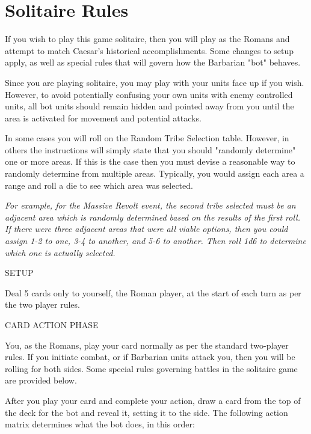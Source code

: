 \section{Solitaire Rules}

If you wish to play this game solitaire, then you will play as the Romans and attempt to match Caesar's historical accomplishments. Some changes to setup apply, as well as special rules that will govern how the Barbarian "bot" behaves.

Since you are playing solitaire, you may play with your units face up if you wish. However, to avoid potentially confusing your own units with enemy controlled units, all bot units should remain hidden and pointed away from you until the area is activated for movement and potential attacks.

In some cases you will roll on the Random Tribe Selection table. However, in others the instructions will simply state that you should "randomly determine" one or more areas. If this is the case then you must devise a reasonable way to randomly determine from multiple areas. Typically, you would assign each area a range and roll a die to see which area was selected.

\textit{For example, for the Massive Revolt event, the second tribe selected must be an adjacent area which is randomly determined based on the results of the first roll. If there were three adjacent areas that were all viable options, then you could assign 1-2 to one, 3-4 to another, and 5-6 to another. Then roll 1d6 to determine which one is actually selected.}

SETUP

Deal 5 cards only to yourself, the Roman player, at the start of each turn as per the two player rules.

CARD ACTION PHASE

You, as the Romans, play your card normally as per the standard two-player rules. If you initiate combat, or if Barbarian units attack you, then you will be rolling for both sides. Some special rules governing battles in the solitaire game are provided below.

After you play your card and complete your action, draw a card from the top of the deck for the bot and reveal it, setting it to the side. The following action matrix determines what the bot does, in this order:


